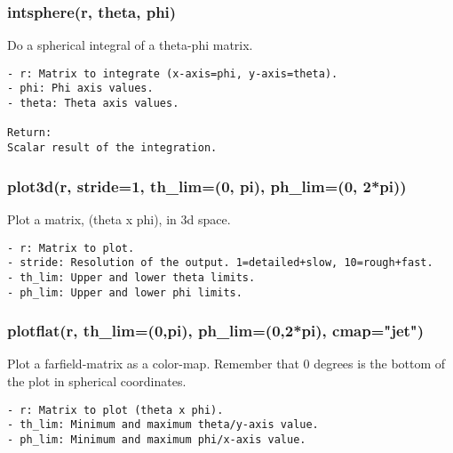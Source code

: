 \subsubsection{intsphere(r, theta, phi)}
Do a spherical integral of a theta-phi matrix.

\begin{verbatim}
- r: Matrix to integrate (x-axis=phi, y-axis=theta).
- phi: Phi axis values.
- theta: Theta axis values.

Return:
Scalar result of the integration.
\end{verbatim}

\subsubsection{plot3d(r, stride=1, th\_lim=(0, pi), ph\_lim=(0, 2*pi))}
Plot a matrix, (theta x phi), in 3d space.

\begin{verbatim}
- r: Matrix to plot.
- stride: Resolution of the output. 1=detailed+slow, 10=rough+fast.
- th_lim: Upper and lower theta limits.
- ph_lim: Upper and lower phi limits.
\end{verbatim}

\subsubsection{plotflat(r, th\_lim=(0,pi), ph\_lim=(0,2*pi), cmap="jet")}
Plot a farfield-matrix as a color-map. Remember that 0 degrees is the bottom
of the plot in spherical coordinates.

\begin{verbatim}
- r: Matrix to plot (theta x phi).
- th_lim: Minimum and maximum theta/y-axis value.
- ph_lim: Minimum and maximum phi/x-axis value.
\end{verbatim}

